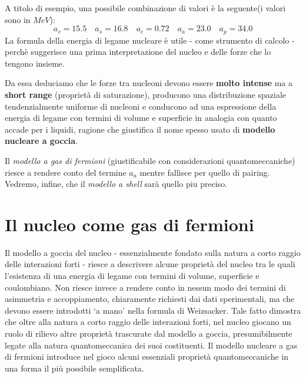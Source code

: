 A titolo di esempio, una possibile combinazione di valori è la seguente(i
valori sono in \(MeV\)):
\[
	a_{v} = 15.5 \quad a_{s} = 16.8 \quad a_{c} = 0.72 \quad a_{a} = 23.0 \quad a_{p} = 34.0
\]
La formula della energia di legame nucleare è utile - come strumento di
calcolo - perchè suggerisce una prima interpretazione del nucleo e delle
forze che lo tengono insieme.

Da essa deduciamo che le forze tra nucleoni devono essere \textbf{molto
	intense} ma a \textbf{short range} (proprietà di saturazione), producono
una distribuzione spaziale tendenzialmente uniforme di nucleoni e
conducono ad una espressione della energia di legame con termini di
volume e superficie in analogia con quanto accade per i liquidi, ragione
che giustifica il nome spesso usato di \textbf{modello nucleare a
	goccia}.

Il \emph{modello a gas di fermioni} (giustificabile con considerazioni
quantomeccaniche) riesce a rendere conto del termine \(a_{a}\) mentre
fallisce per quello di pairing.
Vedremo, infine, che il \emph{modello a shell} sarà quello piu preciso.

\section{Il nucleo come gas di fermioni}\label{sec:il-nucleo-come-gas-di-fermioni}



Il modello a goccia del nucleo - essenzialmente fondato sulla natura a corto raggio delle interazioni forti - riesce a descrivere alcune proprietà del nucleo tra le quali l’esistenza di una energia di legame con termini di volume, superficie e coulombiano.
Non riesce invece a rendere conto in nessun modo dei termini di asimmetria e accoppiamento, chiaramente richiesti dai dati sperimentali, ma che devono essere introdotti ‘a mano’ nella formula di Weizsacker.
Tale fatto dimostra che oltre alla natura a corto raggio delle interazioni forti, nel nucleo giocano un ruolo di rilievo altre proprietà trascurate dal modello a goccia, presumibilmente legate alla natura quantomeccanica dei suoi costituenti.
Il modello nucleare a gas di fermioni introduce nel gioco alcuni essenziali proprietà quantomeccaniche in una forma il più possibile semplificata.

